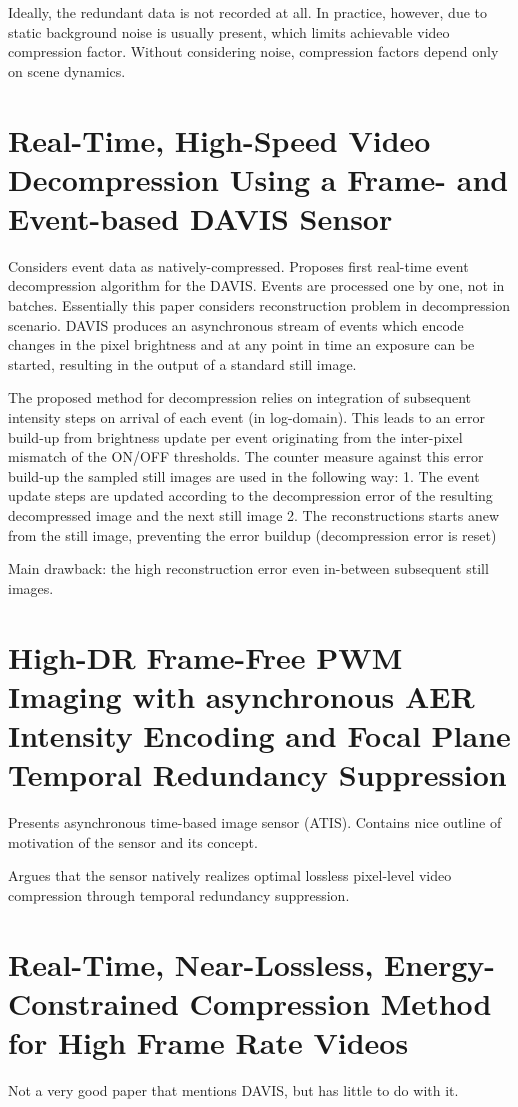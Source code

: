 \documentclass[10pt,a4paper]{article}
\begin{document}
Ideally, the redundant data is not recorded at all. In practice, however, due to static background noise is usually present, which limits achievable video compression factor.
Without considering noise, compression factors depend only on scene dynamics.

\section{Real-Time, High-Speed Video Decompression Using a Frame- and Event-based DAVIS Sensor}
Considers event data as natively-compressed.
Proposes first real-time event decompression algorithm for the DAVIS.
Events are processed one by one, not in batches.
Essentially this paper considers reconstruction problem in decompression scenario.
DAVIS produces an asynchronous stream of events which encode changes in the pixel brightness and at any point in time an exposure can be started, resulting in the output of a standard still image.

The proposed method for decompression relies on integration of subsequent intensity steps on arrival of each event (in log-domain).
This leads to an error build-up from brightness update per event originating from the inter-pixel mismatch of the ON/OFF thresholds.
The counter measure against this error build-up the sampled still images are used in the following way:
1. The event update steps are updated according to the decompression error of the resulting decompressed image and the next still image
2. The reconstructions starts anew from the still image, preventing the error buildup (decompression error is reset)

Main drawback: the high reconstruction error even in-between subsequent still images.

\section{High-DR Frame-Free PWM Imaging with asynchronous AER Intensity Encoding and Focal Plane Temporal Redundancy Suppression}
Presents asynchronous time-based image sensor (ATIS).
Contains nice outline of motivation of the sensor and its concept.

Argues that the sensor natively realizes optimal lossless pixel-level video compression through temporal redundancy suppression.

\section{Real-Time, Near-Lossless, Energy-Constrained Compression Method for High Frame Rate Videos}
Not a very good paper that mentions DAVIS, but has little to do with it.
\end{document}
